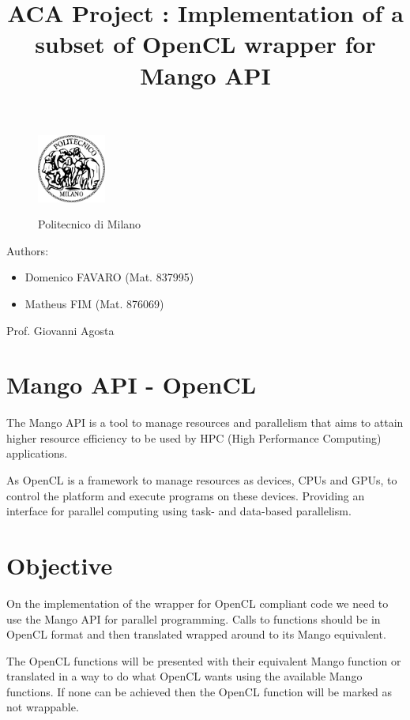 \documentclass[a4paper]{article}
\title{ACA Project : Implementation of a subset of OpenCL wrapper for Mango API}
\begin{document}
\begin{titlepage}
\begin{figure}
\centering
\includegraphics[width=0.2\textwidth]{polimi.jpg}
\par
\LARGE Politecnico di Milano
\end{figure}


\maketitle

\raggedright
Authors:
\begin{itemize}
	\item Domenico FAVARO (Mat. 837995)
        	\item Matheus FIM (Mat. 876069)
\end{itemize}
\raggedleft
Prof. Giovanni Agosta
\thispagestyle{empty}
\end{titlepage}

\tableofcontents
\newpage

\section{Mango API - OpenCL}
The Mango API is a tool to manage resources and parallelism that aims to attain higher resource efficiency to be used by HPC (High Performance Computing) applications. 

As OpenCL is a framework to manage resources as devices, CPUs and GPUs, to control the platform and execute programs on these devices. Providing an interface for parallel computing using task- and data-based parallelism.

\section{Objective}

On the implementation of the wrapper for OpenCL compliant code we need to use the Mango API for parallel programming. Calls to functions should be in OpenCL format and then translated wrapped around to its Mango equivalent.
 
The OpenCL functions will be presented with their equivalent Mango function or translated in a way to do what OpenCL wants using the available Mango functions. If none can be achieved then the OpenCL function will be marked as not wrappable.
\end{document}
